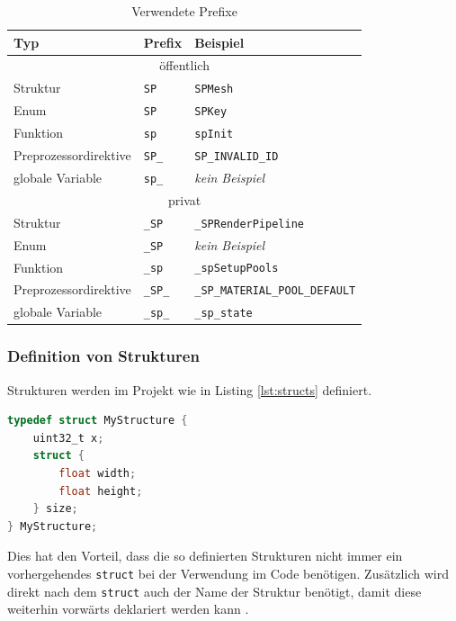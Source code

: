 \documentclass[oneside]{ausarbeitung}
\newcommand*{\quotize}[1]{\glqq #1\grqq}
\begin{document}
\begin{table}
\begin{center}
\begin{tabular}{ |l|l|l| }
\hline
\textbf{Typ} & \textbf{Prefix} & \textbf{Beispiel} \\
\hline
\multicolumn{3}{|c|}{\quotize{öffentlich}} \\
\hline
Struktur & \texttt{SP} & \texttt{SPMesh} \\
\hline
Enum & \texttt{SP} & \texttt{SPKey} \\
\hline
Funktion & \texttt{sp} & \texttt{spInit} \\
\hline
Preprozessordirektive & \texttt{SP\_} & \texttt{SP\_INVALID\_ID} \\
\hline
globale Variable & \texttt{sp\_} & \textit{kein Beispiel} \\
\hline
\multicolumn{3}{|c|}{\quotize{privat}} \\
\hline
Struktur & \texttt{\_SP} & \texttt{\_SPRenderPipeline} \\
\hline
Enum & \texttt{\_SP} & \textit{kein Beispiel} \\
\hline
Funktion & \texttt{\_sp} & \texttt{\_spSetupPools} \\
\hline
Preprozessordirektive & \texttt{\_SP\_} & \texttt{\_SP\_MATERIAL\_POOL\_DEFAULT} \\
\hline
globale Variable & \texttt{\_sp\_} & \texttt{\_sp\_state} \\
\hline
\end{tabular}
\end{center}
\caption{Verwendete Prefixe}
\label{tab:prefixes}
\end{table}

\subsubsection{Definition von Strukturen}
Strukturen werden im Projekt wie in Listing \ref{lst:structs} definiert.

\begin{minipage}{\textwidth}
\begin{lstlisting}[language=C, label={lst:structs}, caption={Definition von Strukturen}]
typedef struct MyStructure {
	uint32_t x;
	struct {
		float width;
		float height;
	} size;
} MyStructure;
\end{lstlisting}
\end{minipage}

Dies hat den Vorteil, dass die so definierten Strukturen nicht immer ein vorhergehendes \texttt{struct} bei der Verwendung im Code benötigen. Zusätzlich wird direkt nach dem \texttt{struct} auch der Name der Struktur benötigt, damit diese weiterhin vorwärts deklariert werden kann \cite[vgl.][]{weissflog:structs}. 
\end{document}
